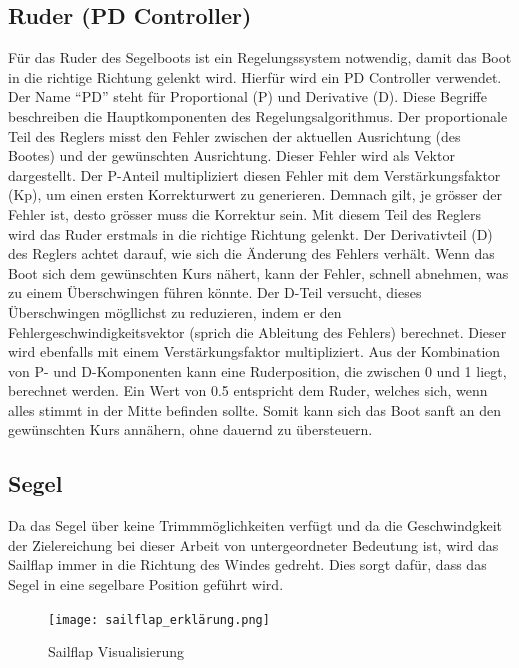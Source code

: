 \subsection{Ruder (PD Controller)}
Für das Ruder des Segelboots ist ein Regelungssystem notwendig, damit das Boot in die richtige Richtung gelenkt wird. Hierfür wird ein PD Controller verwendet. Der Name \enquote{PD} steht für Proportional (P) und Derivative (D). Diese Begriffe beschreiben die Hauptkomponenten des Regelungsalgorithmus. Der proportionale Teil des Reglers misst den Fehler zwischen der aktuellen Ausrichtung (des Bootes) und der gewünschten Ausrichtung. Dieser Fehler wird als Vektor dargestellt. Der P-Anteil multipliziert diesen Fehler mit dem Verstärkungsfaktor (Kp), um einen ersten Korrekturwert zu generieren. Demnach gilt, je grösser der Fehler ist, desto grösser muss die Korrektur sein. Mit diesem Teil des Reglers wird das Ruder erstmals in die richtige Richtung gelenkt. Der Derivativteil (D) des Reglers achtet darauf, wie sich die Änderung des Fehlers verhält. Wenn das Boot sich dem gewünschten Kurs nähert, kann der Fehler, schnell abnehmen, was zu einem Überschwingen führen könnte. Der D-Teil versucht, dieses Überschwingen mögllichst zu reduzieren, indem er den Fehlergeschwindigkeitsvektor (sprich die Ableitung des Fehlers) berechnet. Dieser wird ebenfalls mit einem Verstärkungsfaktor multipliziert. Aus der Kombination von P- und D-Komponenten kann eine Ruderposition, die zwischen 0 und 1 liegt, berechnet werden. Ein Wert von 0.5 entspricht dem Ruder, welches sich, wenn alles stimmt in der Mitte befinden sollte. Somit kann sich das Boot sanft an den gewünschten Kurs annähern, ohne dauernd zu übersteuern. 
\subsection{Segel}
Da das Segel über keine Trimmmöglichkeiten verfügt und da die Geschwindgkeit der Zielereichung bei dieser Arbeit von untergeordneter Bedeutung ist, wird das Sailflap immer in die Richtung des Windes gedreht. Dies sorgt dafür, dass das Segel in eine segelbare Position geführt wird.
\begin{figure}[H]
    \centering
    \texttt{[image: sailflap\_erklärung.png]}
    \caption{Sailflap Visualisierung}
    \label{fig:enter-label}
\end{figure}